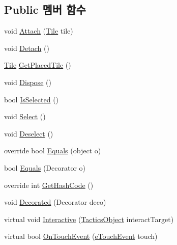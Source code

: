 \subsection*{Public 멤버 함수}
\begin{DoxyCompactItemize}
\item 
void \hyperlink{class_placeable_object_a3176ec3d5d26b2a83cdc58b01e630aa1}{Attach} (\hyperlink{class_tile}{Tile} tile)
\item 
void \hyperlink{class_placeable_object_aef2018b58bf7c8c0fab5aaf3d9a154d4}{Detach} ()
\item 
\hyperlink{class_tile}{Tile} \hyperlink{class_placeable_object_ab44a9b122632ac3cf0babb5040e8a201}{Get\+Placed\+Tile} ()
\item 
void \hyperlink{class_placeable_object_a8bd49b7db556556502a0518fc833be48}{Dispose} ()
\item 
bool \hyperlink{class_placeable_object_a71fd42914caa0dc6229fe6a5ffe09b99}{Is\+Selected} ()
\item 
void \hyperlink{class_placeable_object_a019818f3f6c6eb715fed163efa921f5a}{Select} ()
\item 
void \hyperlink{class_placeable_object_a0c1248b1f9981ddbf68e6f70a6498f3d}{Deselect} ()
\item 
override bool \hyperlink{class_m_c_n_1_1_deco_instance_ac327fa53871e183c0e46ac9c66ba00bc}{Equals} (object o)
\item 
bool \hyperlink{class_m_c_n_1_1_deco_instance_a179363468337afa0d1401ff9da1813f0}{Equals} (Decorator o)
\item 
override int \hyperlink{class_m_c_n_1_1_deco_instance_ab8768bdf4ece9568cc120411c286bfb5}{Get\+Hash\+Code} ()
\item 
void \hyperlink{class_m_c_n_1_1_deco_instance_af6c8520c7bb40840651026e3693afcb4}{Decorated} (Decorator deco)
\item 
virtual void \hyperlink{class_tactics_object_a5f94ed01497a7072a2785163f4cbc57b}{Interactive} (\hyperlink{class_tactics_object}{Tactics\+Object} interact\+Target)
\item 
virtual bool \hyperlink{class_tactics_object_af34052e62ea471d21e4c601cc79ff717}{On\+Touch\+Event} (\hyperlink{_touch_manager_8cs_ae33e321a424fe84ba8b2fdb81ad40a68}{e\+Touch\+Event} touch)
\end{DoxyCompactItemize}
